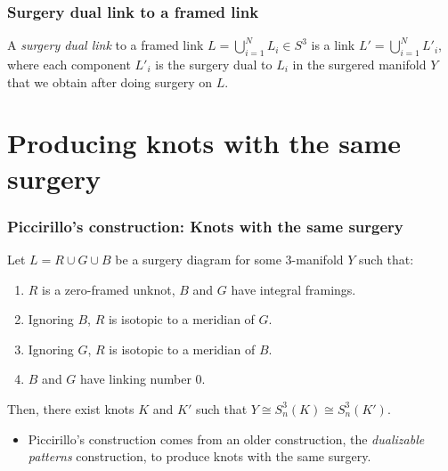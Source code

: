 \documentclass{beamer}
\theoremstyle{ex}
\theoremstyle{rem}
\begin{document}
	\begin{frame}
	\frametitle{Surgery dual link to a framed link}
		\begin{definition}
		A \textit{surgery dual link} to a framed link $L=\bigcup^{N}_{i=1} L_i \in S^3$ is a link $L' = \bigcup^{N}_{i=1} L'_i$, where each component $L'_i$ is the surgery dual to $L_i$ in the surgered manifold $Y$ that we obtain after doing surgery on $L$.
		\end{definition}
	\end{frame}
	

\section{Producing knots with the same surgery}
	\begin{frame}
	\frametitle{Piccirillo's construction: Knots with the same surgery}
	\begin{theorem}[Piccirillo 2018]
		Let $L = R \cup G \cup B$ be a surgery diagram for some 3-manifold $Y$ such that:
		\begin{enumerate}
			\item $R$ is a zero-framed unknot, $B$ and $G$ have integral framings.
			\item Ignoring $B$, $R$ is isotopic to a meridian of $G$.
			\item Ignoring $G$, $R$ is isotopic to a meridian of $B$.
			\item $B$ and $G$ have linking number $0$.
		\end{enumerate}
		Then, there exist knots $K$ and $K'$ such that $Y \cong S^3_{n}(K) \cong S^3_{n}(K')$.
	\end{theorem}
	\begin{itemize}
		\item Piccirillo's construction comes from an older construction, the \textit{dualizable patterns} construction, to produce knots with the same surgery.
	\end{itemize}
\end{frame}
\end{document}
